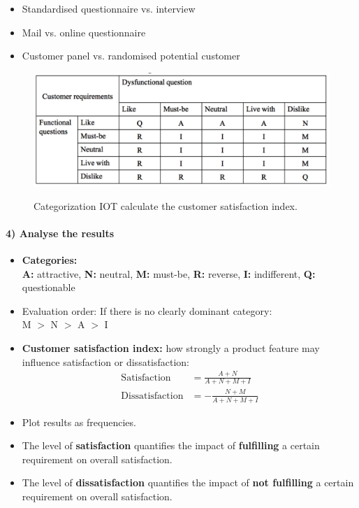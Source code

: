\documentclass[a4paper, landscape, 6pt, fleqn]{scrartcl}
\renewcommand{\emph}[1]{\textbf{#1}}
\begin{document}
\begin{multicols*}{4}
\begin{itemize}
\item Standardised questionnaire vs. interview
\item Mail vs. online questionnaire
\item Customer panel vs. randomised potential customer
\end{itemize}

\begin{figure}[H]
\centering
\includegraphics[width=1.05 \linewidth]{KanoScores}
\label{fig:KanoScores}
\caption{Categorization IOT calculate the customer satisfaction index.}
\end{figure}

\paragraph{4) Analyse the results}

\begin{itemize}
\item \emph{Categories:} \\
\emph{A:} attractive, \emph{N:} neutral, \emph{M:} must-be, \emph{R:} reverse, \emph{I:} indifferent, \emph{Q:} questionable
\item Evaluation order: If there is no clearly dominant category: \\
M $>$ N $>$ A $>$ I
\item \emph{Customer satisfaction index:} how strongly a product feature may influence satisfaction or dissatisfaction:
\begin{align*}
\text{Satisfaction} &= \frac{A+N}{A+N+M+I} \\
\text{Dissatisfaction} &= -\frac{N+M}{A+N+M+I}
\end{align*}
\item Plot results as frequencies.
\item The level of \emph{satisfaction} quantifies the impact of \emph{fulfilling} a certain requirement on overall satisfaction.
\item The level of \emph{dissatisfaction} quantifies the impact of \emph{not fulfilling} a certain requirement on overall satisfaction.
\end{itemize}


\end{multicols*}
\end{document}
